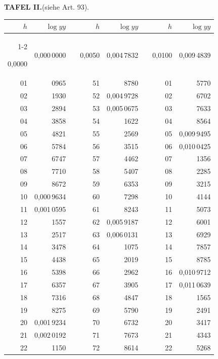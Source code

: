 \clearpage
{}
\begingroup
\centering
\fontsize{9}{9}\selectfont
\setlength{\tabcolsep}{8pt}
\renewcommand{\arraystretch}{1}
\setlength{\parskip}{0pt}
\textbf{TAFEL II.}\quad (siehe Art. 93).
\par\vspace{7pt}
\begin{tabular}{|r|r|@{}p{9pt}@{}|r|r|@{}p{9pt}@{}|r|r|}
\hline
\rule{0pt}{8.5pt}\(h\) & \(\log yy\) & & \(h\) & \(\log yy\) & & \(h\) & \(\log yy\) \\
\cline{1-2}\cline{4-5}\cline{7-8}
\rule{0pt}{8.5pt}0,0000 & 0,000\,0000 &  & 0,0050 & 0,004\,7832 &  & 0,0100 & 0,009\,4839 \\
01 & 0965 &  & 51 & 8780 &  & 01 & 5770 \\
02 & 1930 &  & 52 & 0,004\,9728 &  & 02 & 6702 \\
03 & 2894 &  & 53 & 0,005\,0675 &  & 03 & 7633 \\
04 & 3858 &  & 54 & 1622 &  & 04 & 8564 \\
05 & 4821 &  & 55 & 2569 &  & 05 & 0,009\,9495 \\[3pt]
06 & 5784 &  & 56 & 3515 &  & 06 & 0,010\,0425 \\
07 & 6747 &  & 57 & 4462 &  & 07 & 1356 \\
08 & 7710 &  & 58 & 5407 &  & 08 & 2285 \\
09 & 8672 &  & 59 & 6353 &  & 09 & 3215 \\
10 & 0,000\,9634 &  & 60 & 7298 &  & 10 & 4144 \\[3pt]
11 & 0,001\,0595 &  & 61 & 8243 &  & 11 & 5073 \\
12 & 1557 &  & 62 & 0,005\,9187 &  & 12 & 6001 \\
13 & 2517 &  & 63 & 0,006\,0131 &  & 13 & 6929 \\
14 & 3478 &  & 64 & 1075 &  & 14 & 7857 \\
15 & 4438 &  & 65 & 2019 &  & 15 & 8785 \\[3pt]
16 & 5398 &  & 66 & 2962 &  & 16 & 0,010\,9712 \\
17 & 6357 &  & 67 & 3905 &  & 17 & 0,011\,0639 \\
18 & 7316 &  & 68 & 4847 &  & 18 & 1565 \\
19 & 8275 &  & 69 & 5790 &  & 19 & 2491 \\
20 & 0,001\,9234 &  & 70 & 6732 &  & 20 & 3417 \\[3pt]
21 & 0,002\,0192 &  & 71 & 7673 &  & 21 & 4343 \\
22 & 1150 &  & 72 & 8614 &  & 22 & 5268 \\

\end{tabular}
